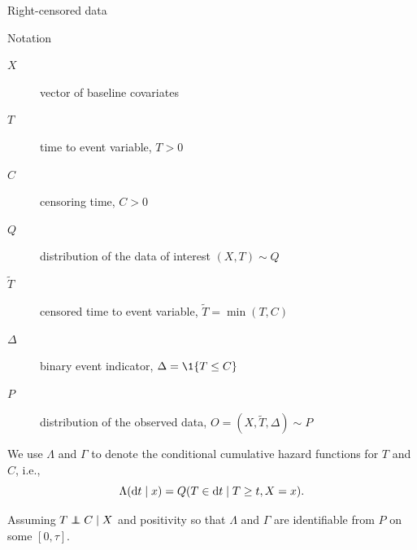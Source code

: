 \documentclass[smaller]{beamer}\usepackage{listings}
\begin{document}
\begin{frame}[label={sec:org5f30ed7}]{Right-censored data}
\small

\begin{block}{Notation}
\begin{description}
\item[{\color{black}\(X\)}] vector of baseline covariates
\item[{\(T\)}] time to event variable, \(T > 0\)
\item[{\(C\)}] censoring time, \(C > 0\)
\item[{\(Q\)}] distribution of the data of interest \((X, T) \sim Q\)
\item[{\color{darkgray}\(\tilde T\)\color{black}}] censored time to event variable, \(\tilde T = \min(T, C)\)
\item[{\color{darkgray}\(\Delta\)\color{black}}] binary event indicator, \(\Delta =
  \1{\{T \leq C\}}\)
\item[{\color{darkgray}\(P\)\color{black}}] distribution of the observed data, \(O =
  (X, \tilde T, \Delta) \sim P\)
\end{description}

\hfill

We use \color{bblue} \(\Lambda\) \color{black} and \color{bblue}\(\Gamma\)
\color{black} to denote the conditional cumulative hazard functions for \(T\)
and \(C\), i.e.,
\begin{equation*}
  \Lambda(\mathop{}\!\mathrm{d} t \mid x) = Q(T \in \mathop{}\!\mathrm{d} t \mid T \geq t, X=x).
\end{equation*}

Assuming \(T \independent C \mid X\) and positivity so that \(\Lambda\) and
\(\Gamma\) are identifiable from \(P\) on some \([0,\tau]\).
\end{block}
\end{frame}
\end{document}
